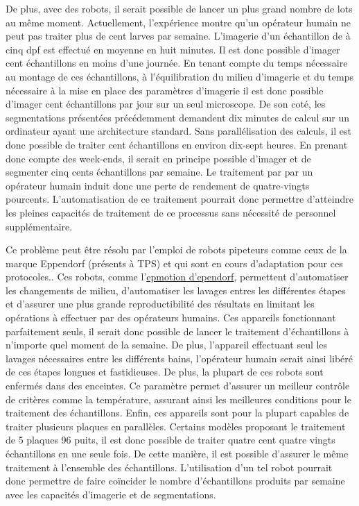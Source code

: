 \documentclass[\main/main.tex]{subfiles}
\begin{document}
De plus, avec des robots,  il serait possible de lancer un plus grand nombre de lots au même moment.
%
Actuellement, l'expérience montre qu'un opérateur humain ne peut pas traiter plus de cent larves par semaine.
%
L'imagerie d'un échantillon de \pz à cinq dpf est effectué en moyenne en huit minutes.
%
Il est donc possible d'imager cent échantillons en moins d'une journée.
%
En tenant compte du temps nécessaire au montage de ces échantillons,
à l'équilibration du milieu d'imagerie et du temps nécessaire à la mise en place des paramètres d'imagerie
il est donc possible d'imager cent échantillons par jour sur un seul microscope. 
%
De son coté, les segmentations présentées précédemment demandent dix minutes de calcul sur un ordinateur ayant une architecture standard.
%
Sans parallélisation des calculs, il est donc possible de traiter cent échantillons en environ dix-sept heures.
%
En prenant donc compte des week-ends, il serait en principe possible d'imager et de segmenter cinq cents échantillons par semaine.
%
Le traitement par \ihc{} par un opérateur humain induit donc une perte de rendement de quatre-vingts pourcents.
%
L'automatisation de ce traitement pourrait donc permettre d'atteindre les pleines capacités de traitement de ce processus sans nécessité de personnel supplémentaire.

%
Ce problème peut être résolu par l'emploi de robots pipeteurs comme ceux de la marque Eppendorf (présents à TPS) et qui sont en cours d'adaptation pour ces protocoles..
%
Ces robots,
comme l'\href{https://online-shop.eppendorf.fr/FR-fr/Automates-de-pipetage-44509.html#goto-Automates-de-pipetage-WebPMain-44509}{epmotion d'ependorf},
permettent d'automatiser les changements de milieu, d'automatiser les lavages entres les différentes étapes
et d'assurer une plus grande reproductibilité des résultats en limitant les opérations à effectuer par des opérateurs humains.
%
Ces appareils fonctionnant parfaitement seuls, il serait donc possible de lancer le traitement d'échantillons à n'importe quel moment de la semaine.
%
De plus, l'appareil effectuant seul les lavages nécessaires entre les différents bains,
l'opérateur humain serait ainsi libéré de ces étapes longues et fastidieuses.
%
De plus, la plupart de ces robots sont enfermés dans des enceintes.
%
Ce paramètre permet d'assurer un meilleur contrôle de critères comme la température,
assurant ainsi les meilleures conditions pour le traitement des échantillons.
%
Enfin, ces appareils sont pour la plupart capables de traiter plusieurs plaques en parallèles.
%
Certains modèles proposant le traitement de 5 plaques 96 puits, il est donc possible de traiter quatre cent quatre vingts échantillons en une seule fois.
%
De cette manière, il est possible d'assurer le même traitement à l'ensemble des échantillons.
%
L'utilisation d'un tel robot pourrait donc permettre de faire coïncider le nombre d'échantillons produits par semaine avec les capacités d'imagerie et de segmentations.
\end{document}
